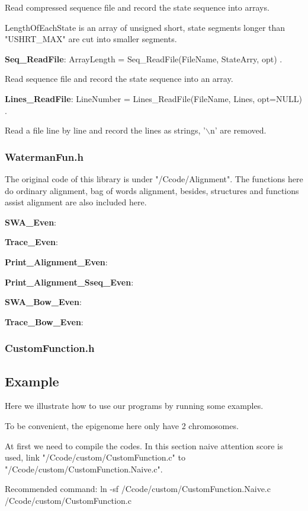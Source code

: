 \documentclass[a4paper]{article}
\begin{document}
\begin{CJK*}{UTF8}{kai}
Read compressed sequence file and record the state sequence into arrays.

LengthOfEachState is an array of unsigned short, state segments longer than "USHRT\_MAX" are cut into smaller segments.

\noindent
\textbf{Seq\_ReadFile}: ArrayLength = Seq\_ReadFile(FileName, StateArry, opt) .

Read sequence file and record the state sequence into an array.

\noindent
\textbf{Lines\_ReadFile}: LineNumber = Lines\_ReadFile(FileName, Lines, opt=NULL)  .

Read a file line by line and record the lines as strings, '$\backslash$n' are removed.

\subsubsection{WatermanFun.h}

The original code of this library is under "/Ccode/Alignment". The functions here do ordinary alignment, bag of words alignment, besides, structures and functions assist alignment are also included here.

\noindent
\textbf{SWA\_Even}:

\noindent
\textbf{Trace\_Even}:

\noindent
\textbf{Print\_Alignment\_Even}:

\noindent
\textbf{Print\_Alignment\_Sseq\_Even}:

\noindent
\textbf{SWA\_Bow\_Even}:

\noindent
\textbf{Trace\_Bow\_Even}:

\subsubsection{CustomFunction.h}

\subsection{Example}
Here we illustrate how to use our programs by running some examples.

To be convenient, the epigenome here only have 2 chromosomes.

At first we need to compile the codes. In this section naive attention score is used, link "/Ccode/custom/CustomFunction.c" to "/Ccode/custom/CustomFunction.Naive.c".

Recommended command: ln -sf /Ccode/custom/CustomFunction.Naive.c /Ccode/custom/CustomFunction.c


\end{CJK*}
\end{document}
